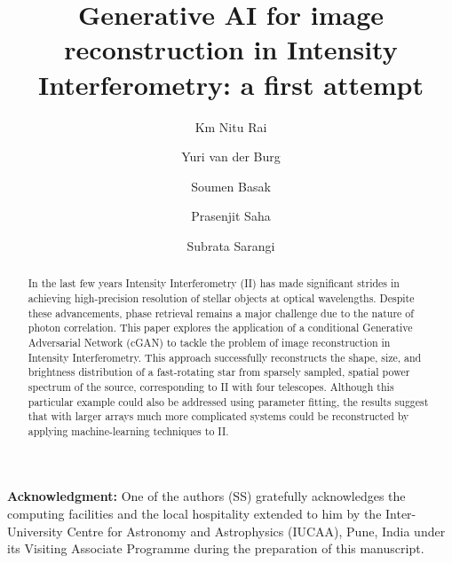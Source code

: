\documentclass[linenumbers, twocolumn]{aastex701}
\begin{document}
\title{Generative AI for image reconstruction in Intensity Interferometry: a first attempt}

\author{Km Nitu Rai}

\author{Yuri van der Burg} 

\author{Soumen Basak}

\author{Prasenjit Saha}

\author{Subrata Sarangi}

\begin{abstract}
In the last few years Intensity Interferometry (II) has made significant strides in achieving high-precision resolution of stellar objects at optical wavelengths. Despite these advancements, phase retrieval remains a major challenge due to the nature of photon correlation. This paper explores the application of a conditional Generative Adversarial Network (cGAN) to tackle the problem of image reconstruction in Intensity Interferometry. This approach successfully reconstructs the shape, size, and brightness distribution of a fast-rotating star from sparsely sampled, spatial power spectrum of the source, corresponding to II with four telescopes.  Although this particular example could also be addressed using parameter fitting, the results suggest that with larger arrays much more complicated systems could be reconstructed by applying machine-learning techniques to II.
\end{abstract}







\begin{acknowledgements}
\textbf{Acknowledgment:} One of the authors (SS) gratefully acknowledges the computing facilities and the local hospitality extended to him by the Inter-University Centre for Astronomy and Astrophysics (IUCAA), Pune, India under its Visiting Associate Programme during the preparation of this manuscript.
\end{acknowledgements}



\end{document}

